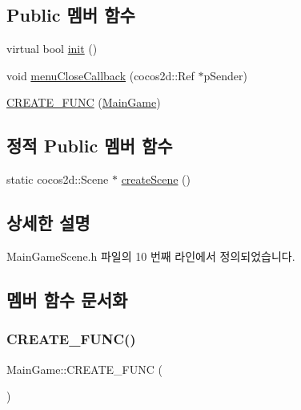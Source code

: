 \subsection*{Public 멤버 함수}
\begin{DoxyCompactItemize}
\item 
virtual bool \hyperlink{class_main_game_ab518edeb854c0447539b829790397dc6}{init} ()
\item 
void \hyperlink{class_main_game_a824206defd2b5af2359c3699aa55e289}{menu\+Close\+Callback} (cocos2d\+::\+Ref $\ast$p\+Sender)
\item 
\hyperlink{class_main_game_a1375b18a8348eb5a58aea4fd678fbad6}{C\+R\+E\+A\+T\+E\+\_\+\+F\+U\+NC} (\hyperlink{class_main_game}{Main\+Game})
\end{DoxyCompactItemize}
\subsection*{정적 Public 멤버 함수}
\begin{DoxyCompactItemize}
\item 
static cocos2d\+::\+Scene $\ast$ \hyperlink{class_main_game_a4d902c709107b834b3cb1dcb8debc1aa}{create\+Scene} ()
\end{DoxyCompactItemize}


\subsection{상세한 설명}


Main\+Game\+Scene.\+h 파일의 10 번째 라인에서 정의되었습니다.



\subsection{멤버 함수 문서화}
\mbox{\label{class_main_game_a1375b18a8348eb5a58aea4fd678fbad6}} 
\subsubsection{\texorpdfstring{C\+R\+E\+A\+T\+E\+\_\+\+F\+U\+N\+C()}{CREATE\_FUNC()}}
{\footnotesize\ttfamily Main\+Game\+::\+C\+R\+E\+A\+T\+E\+\_\+\+F\+U\+NC (\begin{DoxyParamCaption}\item[{\hyperlink{class_main_game}{Main\+Game}}]{ }\end{DoxyParamCaption})}

